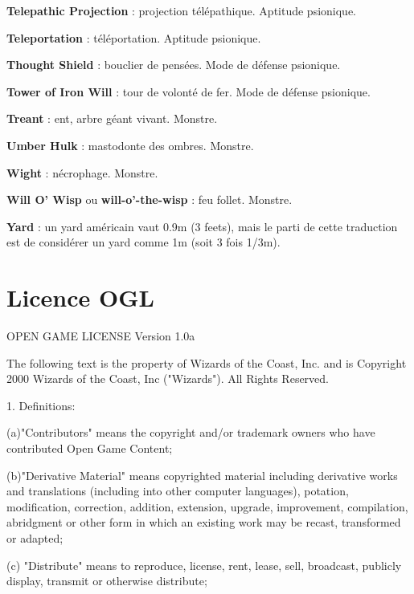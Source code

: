 \documentclass[11pt]{article}
\begin{document}
{\textbf{Telepathic Projection} : projection télépathique. Aptitude psionique.

\textbf{Teleportation} : téléportation. Aptitude psionique.

\textbf{Thought Shield} : bouclier de pensées. Mode de défense psionique.

\textbf{Tower of Iron Will} : tour de volonté de fer. Mode de défense psionique.

\textbf{Treant} : ent, arbre géant vivant. Monstre.

\textbf{Umber Hulk} : mastodonte des ombres. Monstre.

\textbf{Wight} : nécrophage. Monstre.

\textbf{Will O’ Wisp} ou \textbf{will-o'-the-wisp} : feu follet. Monstre.

\textbf{Yard} : un yard américain vaut 0.9m (3 feets), mais le parti de cette traduction est de considérer un yard comme 1m (soit 3 fois 1/3m).

}%


\newpage
{}\section*{Licence OGL}
\label{OGL}

OPEN GAME LICENSE Version 1.0a

\bigskip

The following text is the property of Wizards of the Coast, Inc. and is Copyright 2000 Wizards of the Coast, Inc ("Wizards"). All Rights Reserved.

\bigskip

1. Definitions:

\bigskip

(a)"Contributors" means the copyright and/or trademark owners who have contributed Open Game Content;

\bigskip

(b)"Derivative Material" means copyrighted material including derivative works and translations (including into other computer languages), potation, modification, correction, addition, extension, upgrade, improvement, compilation, abridgment or other form in which an existing work may be recast, transformed or adapted;

\bigskip

(c) "Distribute" means to reproduce, license, rent, lease, sell, broadcast, publicly display, transmit or otherwise distribute;
\end{document}
